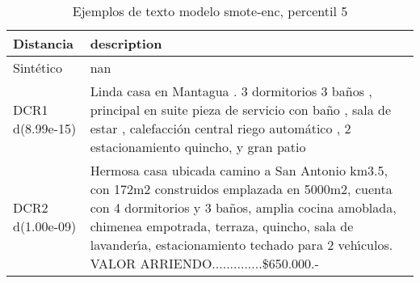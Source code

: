 \begin{table}[H]
\centering
\fontsize{10}{14}\selectfont
\caption{Ejemplos de texto modelo smote-enc, percentil 5}
\label{table-example-economicos-b-1-smote-enc-5p-text}
\begin{tabular}{|l|m{35em}|}
\hline
\rowcolor[gray]{0.8}
Distancia & description \\
\hline Sintético & nan \\
\hline DCR1 d(8.99e-15) & Linda casa en Mantagua .  3 dormitorios 3 ba\~nos , principal en suite  pieza de servicio con ba\~no , sala de estar , calefacci\'on central riego autom\'atico , 2 estacionamiento quincho, y gran patio \\
\hline DCR2 d(1.00e-09) & Hermosa casa ubicada camino a San Antonio km3.5, con 172m2 construidos emplazada en 5000m2, cuenta con 4 dormitorios y 3 ba\~nos, amplia cocina amoblada, chimenea empotrada, terraza, quincho, sala de lavander{\'\i}a, estacionamiento techado para 2 veh{\'\i}culos.
VALOR ARRIENDO..............\$650.000.- \\
\hline
\end{tabular}
\end{table}
